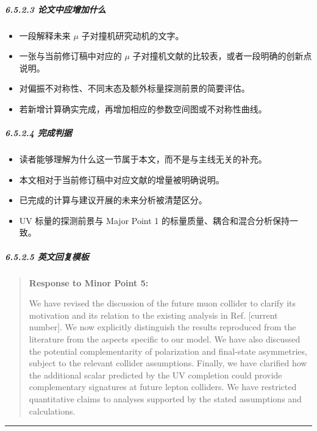 \documentclass[
  chinese,
  UTF8]{ctexart}
\providecommand{\tightlist}{%
  \setlength{\itemsep}{0pt}\setlength{\parskip}{0pt}}
\begin{document}
\subparagraph{6.5.2.3
论文中应增加什么}\label{ux8bbaux6587ux4e2dux5e94ux589eux52a0ux4ec0ux4e48-3}

\begin{itemize}
\tightlist
\item
  一段解释未来 \ensuremath{\mu} 子对撞机研究动机的文字。
\item
  一张与当前修订稿中对应的 \ensuremath{\mu}
  子对撞机文献的比较表，或者一段明确的创新点说明。
\item
  对偏振不对称性、不同末态及额外标量探测前景的简要评估。
\item
  若新增计算确实完成，再增加相应的参数空间图或不对称性曲线。
\end{itemize}

\subparagraph{6.5.2.4 完成判据}\label{ux5b8cux6210ux5224ux636e-3}

\begin{itemize}
\tightlist
\item
  读者能够理解为什么这一节属于本文，而不是与主线无关的补充。
\item
  本文相对于当前修订稿中对应文献的增量被明确说明。
\item
  已完成的计算与建议开展的未来分析被清楚区分。
\item
  UV 标量的探测前景与 Major Point 1 的标量质量、耦合和混合分析保持一致。
\end{itemize}

\subparagraph{6.5.2.5
英文回复模板}\label{ux82f1ux6587ux56deux590dux6a21ux677f-3}

\begin{quote}
\textbf{Response to Minor Point 5:}

We have revised the discussion of the future muon collider to clarify
its motivation and its relation to the existing analysis in Ref.
{[}current number{]}. We now explicitly distinguish the results
reproduced from the literature from the aspects specific to our model.
We have also discussed the potential complementarity of polarization and
final-state asymmetries, subject to the relevant collider assumptions.
Finally, we have clarified how the additional scalar predicted by the UV
completion could provide complementary signatures at future lepton
colliders. We have restricted quantitative claims to analyses supported
by the stated assumptions and calculations.
\end{quote}

\begin{center}\rule{0.5\linewidth}{0.5pt}\end{center}
\end{document}

